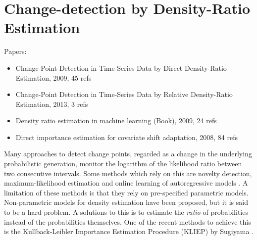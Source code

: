 \section{Change-detection by Density-Ratio Estimation}\label{density-ratio}

Papers:
\begin{itemize}
  \item Change-Point Detection in Time-Series Data by Direct Density-Ratio Estimation, 2009, 45 refs \cite{kawahara2009change}
  \item Change-Point Detection in Time-Series Data by Relative Density-Ratio Estimation, 2013, 3 refs \cite{liu2013change}
  \item Density ratio estimation in machine learning (Book), 2009, 24 refs \cite{sugiyama2012density}
  \item Direct importance estimation for covariate shift adaptation, 2008, 84 refs \cite{sugiyama2008direct}
\end{itemize}









Many approaches to detect change points, regarded as a change in the underlying probabilistic generation, monitor the logarithm of the likelihood ratio between two consecutive intervals.
Some methods which rely on this are novelty detection, maximum-likelihood estimation and online learning of autoregressive models \cite{kawahara2009change}.
A limitation of these methods is that they rely on pre-specified parametric models.
Non-parametric models for density estimation have been proposed, but it is said to be a hard problem.
A solutions to this is to estimate the \emph{ratio} of probabilities instead of the probabilities themselves.
One of the recent methods to achieve this is the Kullback-Leibler Importance Estimation Procedure (KLIEP) by Sugiyama \etal \cite{sugiyama2008direct}.

